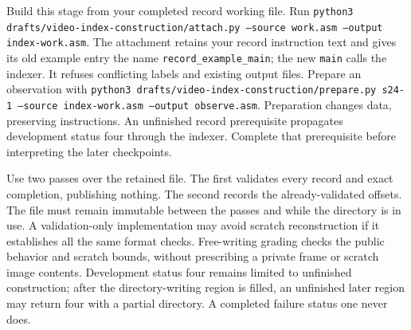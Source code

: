 Build this stage from your completed record working file. Run
\texttt{python3 drafts/video-index-construction/attach.py --source work.asm
  --output index-work.asm}. The attachment retains your record instruction text
and gives its old example entry the name \texttt{record\_example\_main}; the
new \texttt{main} calls the indexer. It refuses conflicting labels and existing
output files. Prepare an observation with
\texttt{python3 drafts/video-index-construction/prepare.py s24-1 --source
  index-work.asm --output observe.asm}. Preparation changes data, preserving
instructions. An unfinished record prerequisite propagates development status
four through the indexer. Complete that prerequisite before interpreting the
later checkpoints.

Use two passes over the retained file. The first validates every record and exact
completion, publishing nothing. The second records the already-validated offsets.
The file must remain immutable between the passes and while the directory is in
use. A validation-only implementation may avoid scratch reconstruction if it
establishes all the same format checks. Free-writing grading checks the public
behavior and scratch bounds, without prescribing a private frame or scratch image
contents. Development status four remains limited to unfinished construction;
after the directory-writing region is filled, an unfinished later region may
return four with a partial directory. A completed failure status one never does.
